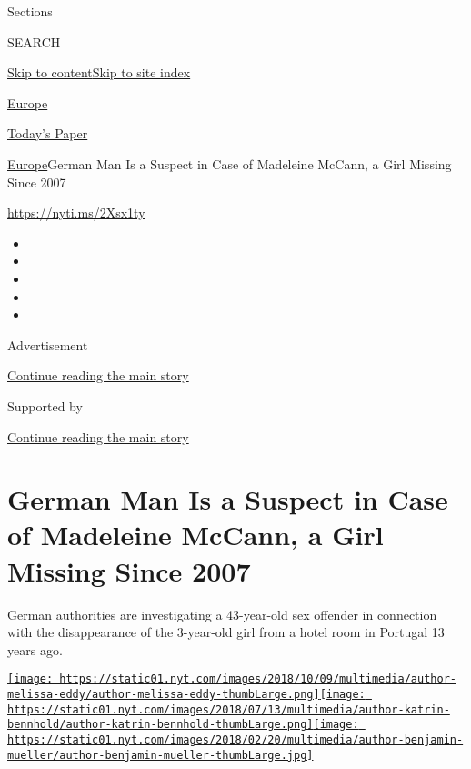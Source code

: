 Sections

SEARCH

\protect\hyperlink{site-content}{Skip to
content}\protect\hyperlink{site-index}{Skip to site index}

\href{https://www.nytimes.com/section/world/europe}{Europe}

\href{https://myaccount.nytimes.com/auth/login?response_type=cookie\&client_id=vi}{}

\href{https://www.nytimes.com/section/todayspaper}{Today's Paper}

\href{/section/world/europe}{Europe}\textbar{}German Man Is a Suspect in
Case of Madeleine McCann, a Girl Missing Since 2007

\url{https://nyti.ms/2Xsx1ty}

\begin{itemize}
\item
\item
\item
\item
\item
\end{itemize}

Advertisement

\protect\hyperlink{after-top}{Continue reading the main story}

Supported by

\protect\hyperlink{after-sponsor}{Continue reading the main story}

\hypertarget{german-man-is-a-suspect-in-case-of-madeleine-mccann-a-girl-missing-since-2007}{%
\section{German Man Is a Suspect in Case of Madeleine McCann, a Girl
Missing Since
2007}\label{german-man-is-a-suspect-in-case-of-madeleine-mccann-a-girl-missing-since-2007}}

German authorities are investigating a 43-year-old sex offender in
connection with the disappearance of the 3-year-old girl from a hotel
room in Portugal 13 years ago.

\href{https://www.nytimes.com/by/melissa-eddy}{\texttt{[image: https://static01.nyt.com/images/2018/10/09/multimedia/author-melissa-eddy/author-melissa-eddy-thumbLarge.png]}}\href{https://www.nytimes.com/by/katrin-bennhold}{\texttt{[image: https://static01.nyt.com/images/2018/07/13/multimedia/author-katrin-bennhold/author-katrin-bennhold-thumbLarge.png]}}\href{https://www.nytimes.com/by/benjamin-mueller}{\texttt{[image: https://static01.nyt.com/images/2018/02/20/multimedia/author-benjamin-mueller/author-benjamin-mueller-thumbLarge.jpg]}}


